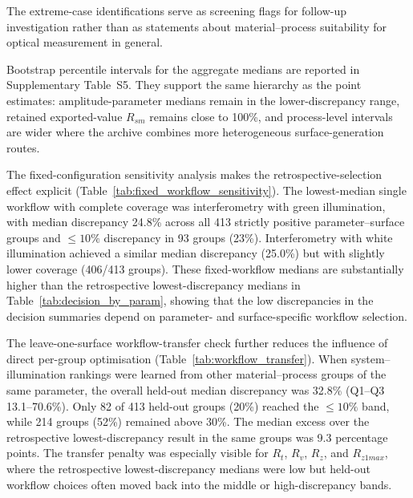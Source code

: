 \documentclass{article}
\begin{document}
The extreme-case identifications serve as screening flags for follow-up investigation rather than as statements about material--process suitability for optical measurement in general.

Bootstrap percentile intervals for the aggregate medians are reported in Supplementary Table~S5. They support the same hierarchy as the point estimates: amplitude-parameter medians remain in the lower-discrepancy range, retained exported-value $R_{sm}$ remains close to 100\%, and process-level intervals are wider where the archive combines more heterogeneous surface-generation routes.




The fixed-configuration sensitivity analysis makes the retrospective-selection effect explicit (Table~\ref{tab:fixed_workflow_sensitivity}). The lowest-median single workflow with complete coverage was interferometry with green illumination, with median discrepancy 24.8\% across all 413 strictly positive parameter--surface groups and $\leq 10\%$ discrepancy in 93 groups (23\%). Interferometry with white illumination achieved a similar median discrepancy (25.0\%) but with slightly lower coverage (406/413 groups). These fixed-workflow medians are substantially higher than the retrospective lowest-discrepancy medians in Table~\ref{tab:decision_by_param}, showing that the low discrepancies in the decision summaries depend on parameter- and surface-specific workflow selection.



The leave-one-surface workflow-transfer check further reduces the influence of direct per-group optimisation (Table~\ref{tab:workflow_transfer}). When system--illumination rankings were learned from other material--process groups of the same parameter, the overall held-out median discrepancy was 32.8\% (Q1--Q3 13.1--70.6\%). Only 82 of 413 held-out groups (20\%) reached the $\leq 10\%$ band, while 214 groups (52\%) remained above 30\%. The median excess over the retrospective lowest-discrepancy result in the same groups was 9.3 percentage points. The transfer penalty was especially visible for $R_t$, $R_v$, $R_z$, and $R_{z1max}$, where the retrospective lowest-discrepancy medians were low but held-out workflow choices often moved back into the middle or high-discrepancy bands.


\end{document}
